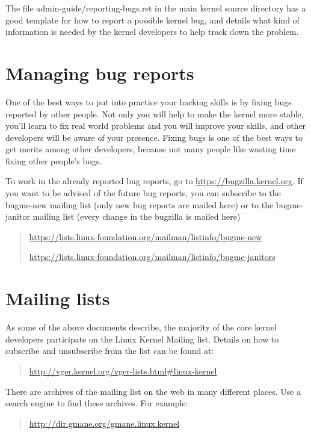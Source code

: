 \documentclass[a4paper,8pt,english]{sphinxmanual}
\begin{document}
The file admin-guide/reporting-bugs.rst in the main kernel source directory has a good
template for how to report a possible kernel bug, and details what kind
of information is needed by the kernel developers to help track down the
problem.


\section{Managing bug reports}
\label{process/howto:managing-bug-reports}
One of the best ways to put into practice your hacking skills is by fixing
bugs reported by other people. Not only you will help to make the kernel
more stable, you'll learn to fix real world problems and you will improve
your skills, and other developers will be aware of your presence. Fixing
bugs is one of the best ways to get merits among other developers, because
not many people like wasting time fixing other people's bugs.

To work in the already reported bug reports, go to \href{https://bugzilla.kernel.org}{https://bugzilla.kernel.org}.
If you want to be advised of the future bug reports, you can subscribe to the
bugme-new mailing list (only new bug reports are mailed here) or to the
bugme-janitor mailing list (every change in the bugzilla is mailed here)
\begin{quote}

\href{https://lists.linux-foundation.org/mailman/listinfo/bugme-new}{https://lists.linux-foundation.org/mailman/listinfo/bugme-new}

\href{https://lists.linux-foundation.org/mailman/listinfo/bugme-janitors}{https://lists.linux-foundation.org/mailman/listinfo/bugme-janitors}
\end{quote}


\section{Mailing lists}
\label{process/howto:mailing-lists}
As some of the above documents describe, the majority of the core kernel
developers participate on the Linux Kernel Mailing list.  Details on how
to subscribe and unsubscribe from the list can be found at:
\begin{quote}

\href{http://vger.kernel.org/vger-lists.html\#linux-kernel}{http://vger.kernel.org/vger-lists.html\#linux-kernel}
\end{quote}

There are archives of the mailing list on the web in many different
places.  Use a search engine to find these archives.  For example:
\begin{quote}

\href{http://dir.gmane.org/gmane.linux.kernel}{http://dir.gmane.org/gmane.linux.kernel}
\end{quote}
\end{document}
